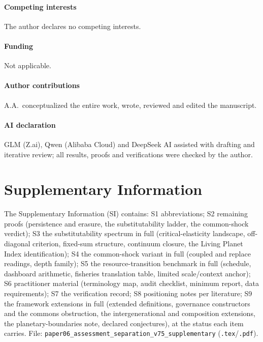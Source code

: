 \documentclass[preprint,11pt,authoryear]{elsarticle}
\theoremstyle{definition}
\theoremstyle{remark}
\begin{document}
\paragraph{Competing interests} The author declares no competing interests.
\paragraph{Funding} Not applicable.
\paragraph{Author contributions} A.A.\ conceptualized the entire work, wrote, reviewed and edited the manuscript.
\paragraph{AI declaration} GLM (Z.ai), Qwen (Alibaba Cloud) and DeepSeek AI assisted with drafting and iterative review; all results, proofs and verifications were checked by the author.

\section*{Supplementary Information}
The Supplementary Information (SI) contains: S1 abbreviations; S2 remaining proofs (persistence and erasure, the substitutability ladder, the common-shock verdict); S3 the substitutability spectrum in full (critical-elasticity landscape, off-diagonal criterion, fixed-sum structure, continuum closure, the Living Planet Index identification); S4 the common-shock variant in full (coupled and replace readings, depth family); S5 the resource-transition benchmark in full (schedule, dashboard arithmetic, fisheries translation table, limited scale/context anchor); S6 practitioner material (terminology map, audit checklist, minimum report, data requirements); S7 the verification record; S8 positioning notes per literature; S9 the framework extensions in full (extended definitions, governance constructors and the commons obstruction, the intergenerational and composition extensions, the planetary-boundaries note, declared conjectures), at the status each item carries. File: \texttt{paper06\_assessment\_separation\_v75\_supplementary} (\texttt{.tex}/\texttt{.pdf}).
\end{document}
